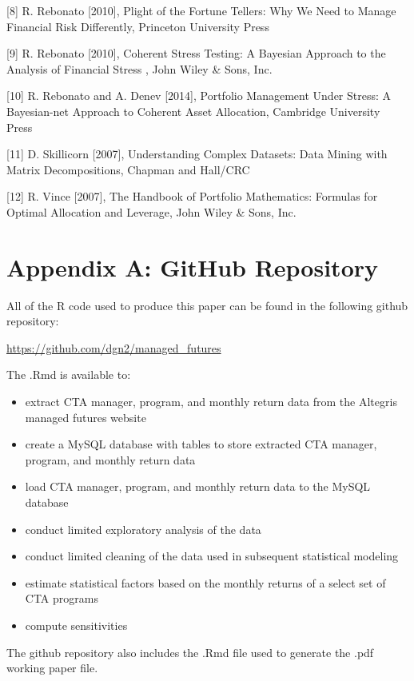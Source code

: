 \documentclass[]{article}
\begin{document}
{[}8{]} R. Rebonato {[}2010{]}, Plight of the Fortune Tellers: Why We
Need to Manage Financial Risk Differently, Princeton University Press

{[}9{]} R. Rebonato {[}2010{]}, Coherent Stress Testing: A Bayesian
Approach to the Analysis of Financial Stress , John Wiley \& Sons, Inc.

{[}10{]} R. Rebonato and A. Denev {[}2014{]}, Portfolio Management Under
Stress: A Bayesian-net Approach to Coherent Asset Allocation, Cambridge
University Press

{[}11{]} D. Skillicorn {[}2007{]}, Understanding Complex Datasets: Data
Mining with Matrix Decompositions, Chapman and Hall/CRC

{[}12{]} R. Vince {[}2007{]}, The Handbook of Portfolio Mathematics:
Formulas for Optimal Allocation and Leverage, John Wiley \& Sons, Inc.

\pagebreak

\section{Appendix A: GitHub
Repository}\label{appendix-a-github-repository}

All of the R code used to produce this paper can be found in the
following github repository:

\url{https://github.com/dgn2/managed_futures}

The .Rmd is available to:

\begin{itemize}
\item
  extract CTA manager, program, and monthly return data from the
  Altegris managed futures website
\item
  create a MySQL database with tables to store extracted CTA manager,
  program, and monthly return data
\item
  load CTA manager, program, and monthly return data to the MySQL
  database
\item
  conduct limited exploratory analysis of the data
\item
  conduct limited cleaning of the data used in subsequent statistical
  modeling
\item
  estimate statistical factors based on the monthly returns of a select
  set of CTA programs
\item
  compute sensitivities
\end{itemize}

The github repository also includes the .Rmd file used to generate the
.pdf working paper file.
\end{document}
